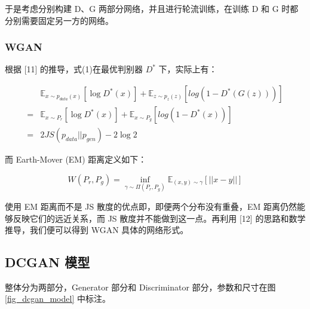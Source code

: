 \documentclass{article}
\begin{document}
\begin{CJK*}{UTF8}{gbsn}
	 于是考虑分别构建 D、G 两部分网络，并且进行轮流训练，在训练 D 和 G 时都分别需要固定另一方的网络。
    
    \subsubsection{WGAN}
   
    根据 [11] 的推导，式(1)在最优判别器 $D^*$ 下，实际上有：
    
    \begin{equation}
    \begin{aligned}
	  &\mathbb{E}_{x\sim p_{data}(x)}[\log D^*(x)] + \mathbb{E}_{z\sim p_z(z)}[log(1-D^*(G(z)))] \\
	  = &\mathbb{E}_{x\sim P_r}[\log D^*(x)] + \mathbb{E}_{x\sim P_g}[log(1-D^*(x))] \\
	  = &2JS(p_{data} || p_{gen}) - 2\log 2
	\end{aligned}
    \end{equation}

	而 Earth-Mover (EM) 距离定义如下：
	
	\begin{equation}
	  W(P_r, P_g) = \inf_{\gamma \sim \Pi(P_r, P_g)} \mathbb{E}_{(x, y) \sim \gamma}[||x-y||]
	\end{equation}
	
	使用 EM 距离而不是 JS 散度的优点即，即便两个分布没有重叠，EM 距离仍然能够反映它们的远近关系，而 JS 散度并不能做到这一点。再利用 [12] 的思路和数学推导，我们便可以得到 WGAN 具体的网络形式。
	
  \subsection{DCGAN 模型}
  
	整体分为两部分，Generator 部分和 Discriminator 部分，参数和尺寸在图 \ref{fig_dcgan_model} 中标注。
	

\end{CJK*}
\end{document}
